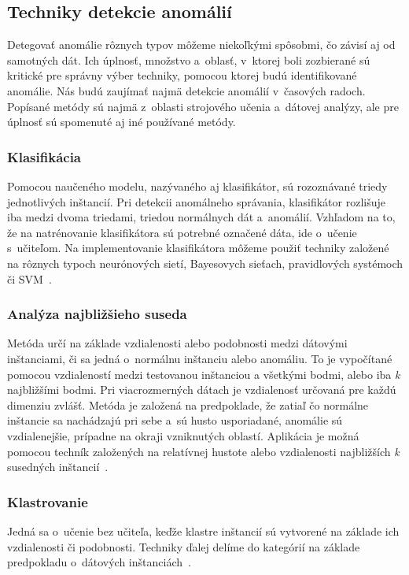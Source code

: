 \documentclass[a4paper,twoside,slovak,12pt]{article}
\begin{document}
\subsection{Techniky detekcie anomálií}
Detegovať anomálie rôznych typov môžeme niekoľkými spôsobmi, čo závisí aj od
samotných dát. Ich úplnosť, množstvo a~oblasť, v~ktorej boli zozbierané sú
kritické pre správny výber techniky, pomocou ktorej budú identifikované anomálie.
Nás budú zaujímať najmä detekcie anomálií v~časových radoch. Popísané metódy
sú najmä z~oblasti strojového učenia a~dátovej analýzy, ale pre úplnosť sú
spomenuté aj iné používané metódy.

\subsubsection{Klasifikácia}
Pomocou naučeného modelu, nazývaného aj klasifikátor, sú rozoznávané triedy
jednotlivých inštancií. Pri detekcii anomálneho správania, klasifikátor rozlišuje
iba medzi dvoma triedami, triedou normálnych dát a~anomálií. Vzhľadom na to, že
na natrénovanie klasifikátora sú potrebné označené dáta, ide o~učenie s~učiteľom.
Na implementovanie klasifikátora môžeme použiť techniky založené na rôznych
typoch neurónových sietí, Bayesovych sieťach, pravidlových systémoch či
SVM~\cite{Chandola2009,Tan2005}.

\subsubsection{Analýza najbližšieho suseda}
Metóda určí na základe vzdialenosti alebo podobnosti medzi dátovými inštanciami,
či sa jedná o~normálnu inštanciu alebo anomáliu. To je vypočítané pomocou
vzdialeností medzi testovanou inštanciou a všetkými bodmi, alebo iba \textit{k}
najbližšími bodmi. Pri viacrozmerných dátach je vzdialenosť určovaná pre
každú dimenziu zvlášť. Metóda je založená na predpoklade, že zatiaľ čo normálne
inštancie sa nachádzajú pri sebe a~sú husto usporiadané, anomálie sú vzdialenejšie,
prípadne na okraji vzniknutých oblastí. Aplikácia je možná pomocou techník založených
na relatívnej hustote alebo vzdialenosti najbližších \textit{k} susedných
inštancií~\cite{Chandola2009,Tan2005}.

\subsubsection{Klastrovanie}
Jedná sa o~učenie bez učiteľa, keďže klastre inštancií sú vytvorené na základe
ich vzdialenosti či podobnosti. Techniky ďalej delíme do kategórií na základe
predpokladu o~dátových inštanciách~\cite{Chandola2009,Tan2005}.
\end{document}
